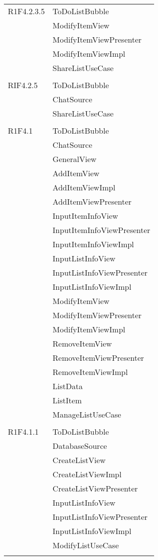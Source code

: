 \begin{center}
\begin{longtable}{|p{7cm}|p{7cm}|}
		R1F4.2.3.5 & ToDoListBubble \\ & ModifyItemView \\ & ModifyItemViewPresenter \\ & ModifyItemViewImpl \\ & ShareListUseCase \\ & \\ \hline
		RIF4.2.5 & ToDoListBubble \\ & ChatSource \\ & ShareListUseCase \\ & \\ \hline
		R1F4.1 & ToDoListBubble \\ & ChatSource \\ & GeneralView \\ & AddItemView \\ & AddItemViewImpl \\ & AddItemViewPresenter \\ & InputItemInfoView \\ & InputItemInfoViewPresenter \\ & InputItemInfoViewImpl \\ & InputListInfoView \\ & InputListInfoViewPresenter \\ & InputListInfoViewImpl \\ & ModifyItemView \\ & ModifyItemViewPresenter \\ & ModifyItemViewImpl \\ & RemoveItemView \\ & RemoveItemViewPresenter \\ & RemoveItemViewImpl \\ & ListData \\ & ListItem \\ & ManageListUseCase \\ & \\ \hline
		R1F4.1.1 & ToDoListBubble \\ & DatabaseSource \\ & CreateListView \\ & CreateListViewImpl \\ & CreateListViewPresenter \\ & InputListInfoView \\ & InputListInfoViewPresenter \\ & InputListInfoViewImpl \\ & ModifyListUseCase \\ & \\ \hline

\end{longtable}
\end{center}
